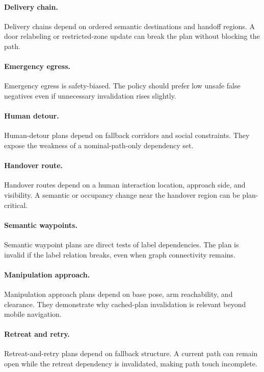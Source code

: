 \documentclass{article}
\begin{document}
\paragraph{Delivery chain.}
Delivery chains depend on ordered semantic destinations and handoff regions. A door relabeling or restricted-zone update can break the plan without blocking the path.

\paragraph{Emergency egress.}
Emergency egress is safety-biased. The policy should prefer low unsafe false negatives even if unnecessary invalidation rises slightly.

\paragraph{Human detour.}
Human-detour plans depend on fallback corridors and social constraints. They expose the weakness of a nominal-path-only dependency set.

\paragraph{Handover route.}
Handover routes depend on a human interaction location, approach side, and visibility. A semantic or occupancy change near the handover region can be plan-critical.

\paragraph{Semantic waypoints.}
Semantic waypoint plans are direct tests of label dependencies. The plan is invalid if the label relation breaks, even when graph connectivity remains.

\paragraph{Manipulation approach.}
Manipulation approach plans depend on base pose, arm reachability, and clearance. They demonstrate why cached-plan invalidation is relevant beyond mobile navigation.

\paragraph{Retreat and retry.}
Retreat-and-retry plans depend on fallback structure. A current path can remain open while the retreat dependency is invalidated, making path touch incomplete.
\end{document}

